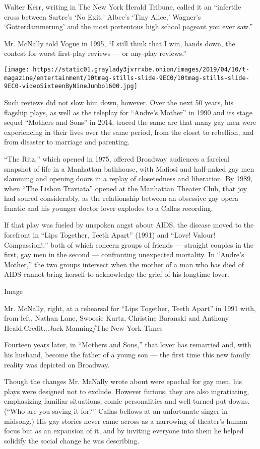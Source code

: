 Walter Kerr, writing in The New York Herald Tribune, called it an
``infertile cross between Sartre's `No Exit,' Albee's `Tiny Alice,'
Wagner's `Gotterdammerung' and the most portentous high school pageant
you ever saw.''

Mr. McNally told Vogue in 1995, ``I still think that I win, hands down,
the contest for worst first-play reviews --- or any-play reviews.''

\texttt{[image: https://static01.graylady3jvrrxbe.onion/images/2019/04/10/t-magazine/entertainment/10tmag-stills-slide-9EC0/10tmag-stills-slide-9EC0-videoSixteenByNineJumbo1600.jpg]}

Such reviews did not slow him down, however. Over the next 50 years, his
flagship plays, as well as the teleplay for ``Andre's Mother'' in 1990
and its stage sequel ``Mothers and Sons'' in 2014, traced the same arc
that many gay men were experiencing in their lives over the same period,
from the closet to rebellion, and from disaster to marriage and
parenting.

``The Ritz,'' which opened in 1975, offered Broadway audiences a
farcical snapshot of life in a Manhattan bathhouse, with Mafiosi and
half-naked gay men slamming and opening doors in a replay of
closetedness and liberation. By 1989, when ``The Lisbon Traviata''
opened at the Manhattan Theater Club, that joy had soured considerably,
as the relationship between an obsessive gay opera fanatic and his
younger doctor lover explodes to a Callas recording.

If that play was fueled by unspoken angst about AIDS, the disease moved
to the forefront in ``Lips Together, Teeth Apart'' (1991) and ``Love!
Valour! Compassion!,'' both of which concern groups of friends ---
straight couples in the first, gay men in the second --- confronting
unexpected mortality. In ``Andre's Mother,'' the two groups intersect
when the mother of a man who has died of AIDS cannot bring herself to
acknowledge the grief of his longtime lover.

Image

Mr. McNally, right, at a rehearsal for ``Lips Together, Teeth Apart'' in
1991 with, from left, Nathan Lane, Swoosie Kurtz, Christine Baranski and
Anthony Heald.Credit...Jack Manning/The New York Times

Fourteen years later, in ``Mothers and Sons,'' that lover has remarried
and, with his husband, become the father of a young son --- the first
time this new family reality was depicted on Broadway.

Though the changes Mr. McNally wrote about were epochal for gay men, his
plays were designed not to exclude. However furious, they are also
ingratiating, emphasizing familiar situations, comic personalities and
well-turned put-downs. (``Who are you saving it for?'' Callas bellows at
an unfortunate singer in midsong.) His gay stories never came across as
a narrowing of theater's human focus but as an expansion of it, and by
inviting everyone into them he helped solidify the social change he was
describing.

